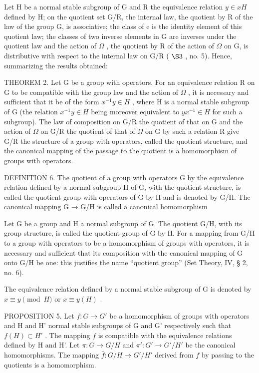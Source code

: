 Let H be a normal stable subgroup of G and R the equivalence relation \(y \in xH\) defined by H; on the quotient set G/R, the internal law, the quotient by R of the law of the group G, is associative; the class of e is the identity element of this quotient law; the classes of two inverse elements in G are inverses under the quotient law and the action of \(\Omega\) , the quotient by R of the action of \(\Omega\) on G, is distributive with respect to the internal law on G/R ( \(\S 3\) , no. 5). Hence, summarizing the results obtained:

THEOREM 2. Let G be a group with operators. For an equivalence relation R on G to be compatible with the group law and the action of \(\Omega\) , it is necessary and sufficient that it be of the form \(x^{-1}y \in H\) , where H is a normal stable subgroup of G (the relation \(x^{-1}y \in H\) being moreover equivalent to \(yx^{-1} \in H\) for such a subgroup). The law of composition on G/R the quotient of that on G and the action of \(\Omega\) on G/R the quotient of that of \(\Omega\) on G by such a relation R give G/R the structure of a group with operators, called the quotient structure, and the canonical mapping of the passage to the quotient is a homomorphism of groups with operators.

DEFINITION 6. The quotient of a group with operators G by the equivalence relation defined by a normal subgroup H of G, with the quotient structure, is called the quotient group with operators of G by H and is denoted by G/H. The canonical mapping G → G/H is called a canonical homomorphism

Let G be a group and H a normal subgroup of G. The quotient G/H, with its group structure, is called the quotient group of G by H. For a mapping from G/H to a group with operators to be a homomorphism of groups with operators, it is necessary and sufficient that its composition with the canonical mapping of G onto G/H be one: this justifies the name ``quotient group'' (Set Theory, IV, § 2, no. 6).

The equivalence relation defined by a normal stable subgroup of G is denoted by \(x \equiv y \pmod{H}\) or \(x \equiv y(H)\) .

PROPOSITION 5. Let \(f: G \to G'\) be a homomorphism of groups with operators and H and H' normal stable subgroups of G and G' respectively such that \(f(H) \subset H'\) . The mapping \(f\) is compatible with the equivalence relations defined by H and H'. Let \(\pi: G \to G/H\) and \(\pi': G' \to G'/H'\) be the canonical homomorphisms. The mapping \(\bar{f}: G/H \to G'/H'\) derived from \(f\) by passing to the quotients is a homomorphism.

